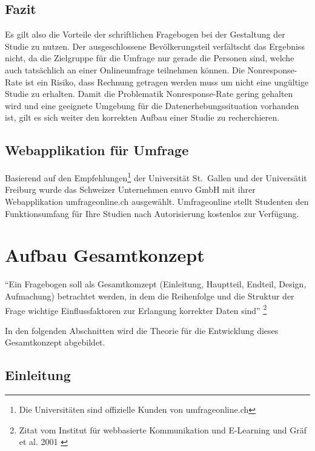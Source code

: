\newpage

\subsection{Fazit}\label{fazit-1}

Es gilt also die Vorteile der schriftlichen Fragebogen bei der
Gestaltung der Studie zu nutzen. Der ausgeschlossene Bevölkerungsteil
verfältscht das Ergebniss nicht, da die Zielgruppe für die Umfrage nur
gerade die Personen sind, welche auch tatsächlich an einer Onlineumfrage
teilnehmen können. Die Nonresponse-Rate ist ein Risiko, dass Rechnung
getragen werden muss um nicht eine ungültige Studie zu erhalten. Damit
die Problematik Nonresponse-Rate gering gehalten wird und eine geeignete
Umgebung für die Datenerhebungssituation vorhanden ist, gilt es sich
weiter den korrekten Aufbau einer Studie zu recherchieren.

\subsection{Webapplikation für
Umfrage}\label{webapplikation-fuxfcr-umfrage}

Basierend auf den Empfehlungen\footnote{Die Universitäten sind
  offizielle Kunden von umfrageonline.ch} der Universität St.~Gallen und
der Universätit Freiburg wurde das Schweizer Unternehmen enuvo GmbH mit
ihrer Webapplikation umfrageonline.ch ausgewählt. Umfrageonline stellt
Studenten den Funktionsumfang für Ihre Studien nach Autorisierung
kostenlos zur Verfügung.

\section{Aufbau Gesamtkonzept}\label{aufbau-gesamtkonzept}

``Ein Fragebogen soll als Gesamtkomzept (Einleitung, Hauptteil, Endteil,
Design, Aufmachung) betrachtet werden, in dem die Reihenfolge und die
Struktur der Frage wichtige Einflussfaktoren zur Erlangung korrekter
Daten sind'' \footnote{Zitat vom Institut für webbasierte Kommunikation
  und E-Learning und Gräf et al. 2001 \autocite{fragebogen}}

In den folgenden Abschnitten wird die Theorie für die Entwicklung dieses
Gesamtkonzept abgebildet.

\subsection{Einleitung}\label{einleitung}

